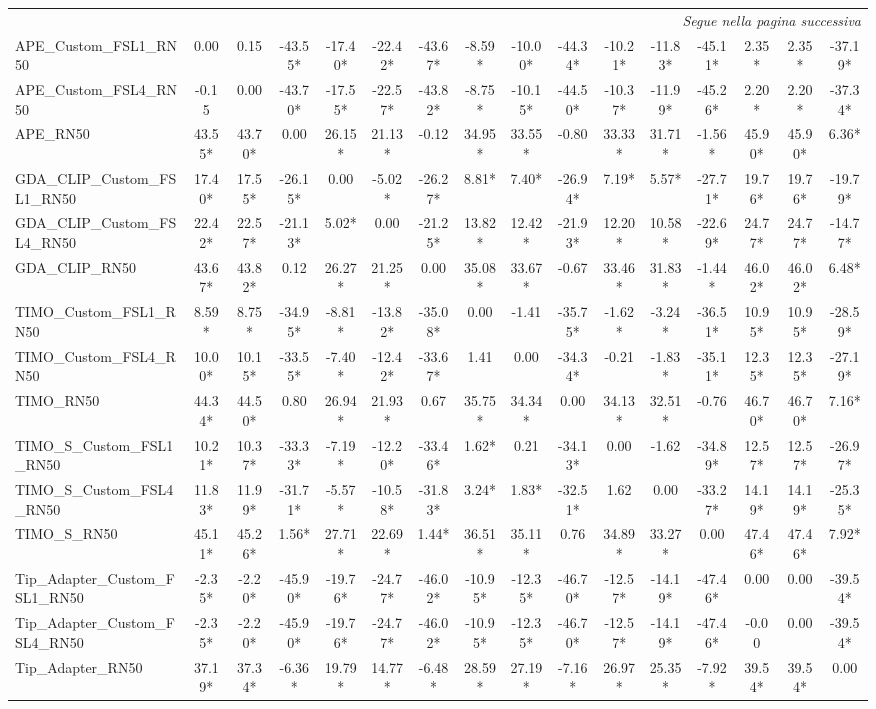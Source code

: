 \begin{scriptsize}
\begin{longtable}{l|ccccccccccccccc}
\midrule
\endhead
\midrule
\multicolumn{16}{r}{\textit{Segue nella pagina successiva}} \\
\endfoot
\bottomrule
\endlastfoot
APE\_Custom\_FSL1\_RN50 & 0.00 & 0.15 & -43.55* & -17.40* & -22.42* & -43.67* & -8.59* & -10.00* & -44.34* & -10.21* & -11.83* & -45.11* & 2.35* & 2.35* & -37.19* \\
APE\_Custom\_FSL4\_RN50 & -0.15 & 0.00 & -43.70* & -17.55* & -22.57* & -43.82* & -8.75* & -10.15* & -44.50* & -10.37* & -11.99* & -45.26* & 2.20* & 2.20* & -37.34* \\
APE\_RN50 & 43.55* & 43.70* & 0.00 & 26.15* & 21.13* & -0.12 & 34.95* & 33.55* & -0.80 & 33.33* & 31.71* & -1.56* & 45.90* & 45.90* & 6.36* \\
GDA\_CLIP\_Custom\_FSL1\_RN50 & 17.40* & 17.55* & -26.15* & 0.00 & -5.02* & -26.27* & 8.81* & 7.40* & -26.94* & 7.19* & 5.57* & -27.71* & 19.76* & 19.76* & -19.79* \\
GDA\_CLIP\_Custom\_FSL4\_RN50 & 22.42* & 22.57* & -21.13* & 5.02* & 0.00 & -21.25* & 13.82* & 12.42* & -21.93* & 12.20* & 10.58* & -22.69* & 24.77* & 24.77* & -14.77* \\
GDA\_CLIP\_RN50 & 43.67* & 43.82* & 0.12 & 26.27* & 21.25* & 0.00 & 35.08* & 33.67* & -0.67 & 33.46* & 31.83* & -1.44* & 46.02* & 46.02* & 6.48* \\
TIMO\_Custom\_FSL1\_RN50 & 8.59* & 8.75* & -34.95* & -8.81* & -13.82* & -35.08* & 0.00 & -1.41 & -35.75* & -1.62* & -3.24* & -36.51* & 10.95* & 10.95* & -28.59* \\
TIMO\_Custom\_FSL4\_RN50 & 10.00* & 10.15* & -33.55* & -7.40* & -12.42* & -33.67* & 1.41 & 0.00 & -34.34* & -0.21 & -1.83* & -35.11* & 12.35* & 12.35* & -27.19* \\
TIMO\_RN50 & 44.34* & 44.50* & 0.80 & 26.94* & 21.93* & 0.67 & 35.75* & 34.34* & 0.00 & 34.13* & 32.51* & -0.76 & 46.70* & 46.70* & 7.16* \\
TIMO\_S\_Custom\_FSL1\_RN50 & 10.21* & 10.37* & -33.33* & -7.19* & -12.20* & -33.46* & 1.62* & 0.21 & -34.13* & 0.00 & -1.62 & -34.89* & 12.57* & 12.57* & -26.97* \\
TIMO\_S\_Custom\_FSL4\_RN50 & 11.83* & 11.99* & -31.71* & -5.57* & -10.58* & -31.83* & 3.24* & 1.83* & -32.51* & 1.62 & 0.00 & -33.27* & 14.19* & 14.19* & -25.35* \\
TIMO\_S\_RN50 & 45.11* & 45.26* & 1.56* & 27.71* & 22.69* & 1.44* & 36.51* & 35.11* & 0.76 & 34.89* & 33.27* & 0.00 & 47.46* & 47.46* & 7.92* \\
Tip\_Adapter\_Custom\_FSL1\_RN50 & -2.35* & -2.20* & -45.90* & -19.76* & -24.77* & -46.02* & -10.95* & -12.35* & -46.70* & -12.57* & -14.19* & -47.46* & 0.00 & 0.00 & -39.54* \\
Tip\_Adapter\_Custom\_FSL4\_RN50 & -2.35* & -2.20* & -45.90* & -19.76* & -24.77* & -46.02* & -10.95* & -12.35* & -46.70* & -12.57* & -14.19* & -47.46* & -0.00 & 0.00 & -39.54* \\
Tip\_Adapter\_RN50 & 37.19* & 37.34* & -6.36* & 19.79* & 14.77* & -6.48* & 28.59* & 27.19* & -7.16* & 26.97* & 25.35* & -7.92* & 39.54* & 39.54* & 0.00 \\
\end{longtable}
\end{scriptsize}